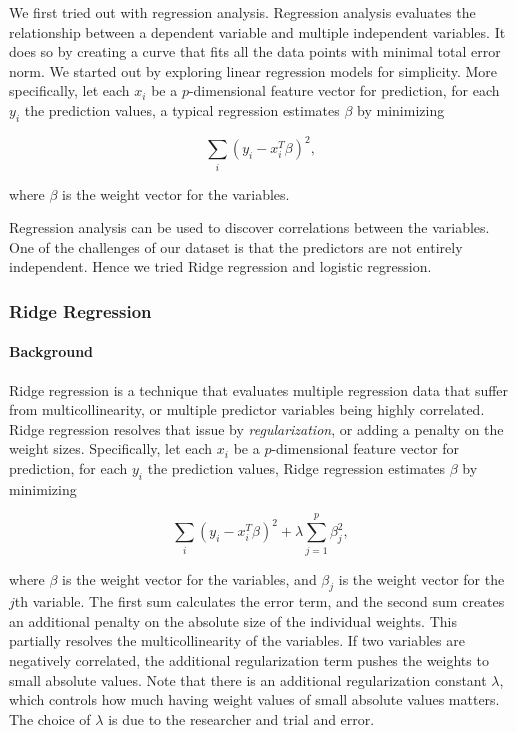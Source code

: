 \documentclass[]{article}
\begin{document}
We first tried out with regression analysis. Regression analysis evaluates the relationship between a dependent variable and multiple independent variables. It does so by creating a curve that fits all the data points with minimal total error norm. We started out by exploring linear regression models for simplicity. More specifically, let each $x_i$ be a $p$-dimensional feature vector for prediction, for each $y_i$ the prediction values, a typical regression estimates $\beta$ by minimizing

\begin{equation*}
\sum_{i}{(y_i - x_i^T\beta)^2},
\end{equation*}

where $\beta$ is the weight vector for the variables. 

Regression analysis can be used to discover correlations between the variables. One of the challenges of our dataset is that the predictors are not entirely independent. Hence we tried Ridge regression and logistic regression.


\subsubsection{Ridge Regression}
\paragraph{Background}
Ridge regression is a technique that evaluates multiple regression data that suffer from multicollinearity\cite{ridge}, or multiple predictor variables being highly correlated. Ridge regression resolves that issue by \textit{regularization}, or adding a penalty on the weight sizes. Specifically, let each $x_i$ be a $p$-dimensional feature vector for prediction, for each $y_i$ the prediction values, Ridge regression estimates $\beta$ by minimizing

\begin{equation*}
\sum_{i}{(y_i - x_i^T\beta)^2 + \lambda\sum_{j=1}^p{\beta_j^2}},
\end{equation*}

where $\beta$ is the weight vector for the variables, and $\beta_j$ is the weight vector for the $j$th variable. The first sum calculates the error term, and the second sum creates an additional penalty on the absolute size of the individual weights. This partially resolves the multicollinearity of the variables. If two variables are negatively correlated, the additional regularization term pushes the weights to small absolute values\cite{bishop}. Note that there is an additional regularization constant $\lambda$, which controls how much having weight values of small absolute values matters. The choice of $\lambda$ is due to the researcher and trial and error.
\end{document}
